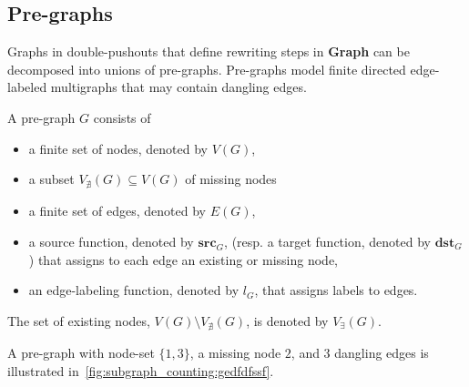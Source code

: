 \subsection{Pre-graphs}
Graphs in double-pushouts that define rewriting steps in \textbf{Graph} can be decomposed into unions of pre-graphs. Pre-graphs model finite directed edge-labeled multigraphs that may contain dangling edges.
\begin{definition}
    \label{def:pre-graph}
    A pre-graph $G$ consists of
    \begin{itemize}
        \item a finite set of nodes, denoted by $V(G)$,
        \item a subset $V_{\nexists}(G) \subseteq V(G)$ of missing nodes
        \item a finite set of edges, denoted by $E(G)$,
        \item a source function, denoted by \( \textbf{src}_G \), (resp. a target function, denoted by \( \textbf{dst}_G \)) that assigns to each edge an existing or missing node,
        \item an edge-labeling function, denoted by $l_G$, that assigns labels to edges.
    \end{itemize}
\end{definition} 
The set of existing nodes, $V(G) \setminus V_{\nexists}(G)$, is denoted by $V_\exists(G)$.

 \begin{example}
    \label{def:pregraph}
     A pre-graph with node-set $\{1,3\}$, a missing node $2$, and 3 dangling edges is illustrated in~\autoref{fig:subgraph_counting:gedfdfssf}.
     \begin{figure}[H]
        \centering
    \caption{}
    \label{fig:subgraph_counting:gedfdfssf}
    \end{figure}
 \end{example}
 
